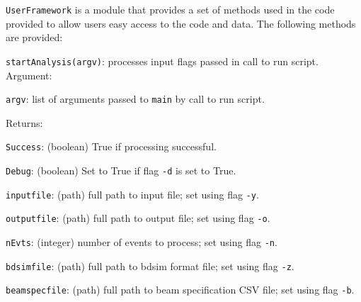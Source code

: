 \texttt{UserFramework} is a module that provides a set of methods used
in the code provided to allow users easy access to the code and data.
The following methods are provided: \\
\begin{description}
  \item{\texttt{startAnalysis(argv)}}: processes input flags passed
    in call to run script.  \\
    Argument:
    \begin{description}
      \item{\texttt{argv}}: list of arguments passed to \texttt{main}
        by call to run script.
    \end{description}
    Returns:
    \begin{description}
      \item{\texttt{Success}}:      (boolean) True if processing successful.
      \item{\texttt{Debug}}:        (boolean) Set to True if
                                    flag \texttt{-d} is set to True.
      \item{\texttt{inputfile}}:    (path) full path to input file; set
                                    using flag \texttt{-y}.
      \item{\texttt{outputfile}}:   (path) full path to output file; set
                                    using flag \texttt{-o}.
      \item{\texttt{nEvts}}:        (integer) number of events to
                                    process; set using flag \texttt{-n}.
      \item{\texttt{bdsimfile}}:    (path) full path to bdsim format file; set
                                    using flag \texttt{-z}.
      \item{\texttt{beamspecfile}}: (path) full path to beam
                                    specification CSV file; set
                                    using flag \texttt{-b}. \\
    \end{description}
    

\end{description}
